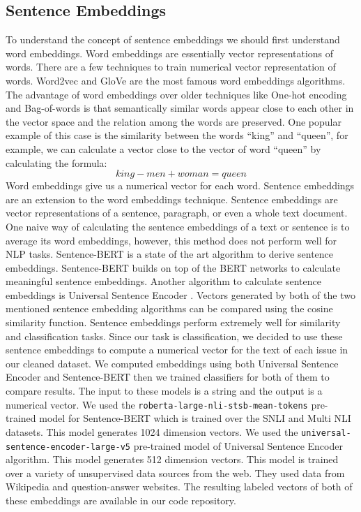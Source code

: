 \documentclass[conference]{IEEEtran}
\begin{document}
\subsection{Sentence Embeddings}
To understand the concept of sentence embeddings we should first understand word embeddings.
Word embeddings are essentially vector representations of words. There are a few techniques to train
numerical vector representation of words. Word2vec \cite{mikolov2013efficient,mikolov2013distributed} 
and GloVe \cite{pennington2014glove} are the most famous word embeddings algorithms. The advantage of
word embeddings over older techniques like One-hot encoding and Bag-of-words is that semantically similar
words appear close to each other in the vector space and the relation among the words are preserved.
One popular example of this case is the similarity between the words ``king'' and ``queen'', for example,
we can calculate a vector close to the vector of word ``queen'' by calculating the formula:
\begin{equation}
  king-men+woman=queen
\end{equation}
Word embeddings give us a numerical vector for each word. Sentence embeddings are an extension to 
the word embeddings technique. Sentence embeddings are vector representations of a sentence, paragraph, 
or even a whole text document. One naive way of calculating the sentence embeddings of a text or sentence 
is to average its word embeddings, however, this method does not perform well for NLP tasks. 
Sentence-BERT \cite{reimers-2019-sentence-bert} is a state of the art 
algorithm to derive sentence embeddings. Sentence-BERT builds on top of the BERT \cite{devlin2019bert} networks 
to calculate meaningful sentence embeddings. Another algorithm to calculate sentence embeddings is 
Universal Sentence Encoder \cite{cer2018universal}. Vectors generated by both of the two mentioned sentence
embedding algorithms can be compared using the cosine similarity function. Sentence embeddings perform
extremely well for similarity and classification tasks. Since our task is classification, we decided to 
use these sentence embeddings to compute a numerical vector for the text of each issue in our 
cleaned dataset. We computed embeddings using both Universal Sentence Encoder and Sentence-BERT then we trained
classifiers for both of them to compare results. The input to these models is a string and the output is 
a numerical vector. We used the \verb|roberta-large-nli-stsb-mean-tokens| pre-trained 
model for Sentence-BERT which is trained over the SNLI \cite{snli:emnlp2015} and Multi NLI \cite{N18-1101} datasets. 
This model generates 1024 dimension vectors. We used the 
\verb|universal-sentence-encoder-large-v5| pre-trained model of Universal Sentence Encoder algorithm. This model generates 
512 dimension vectors. This model is trained over a variety of unsupervised data sources from the web. They used data
from Wikipedia and question-answer websites. The resulting labeled vectors of both of these embeddings 
are available in our code repository.
\end{document}
